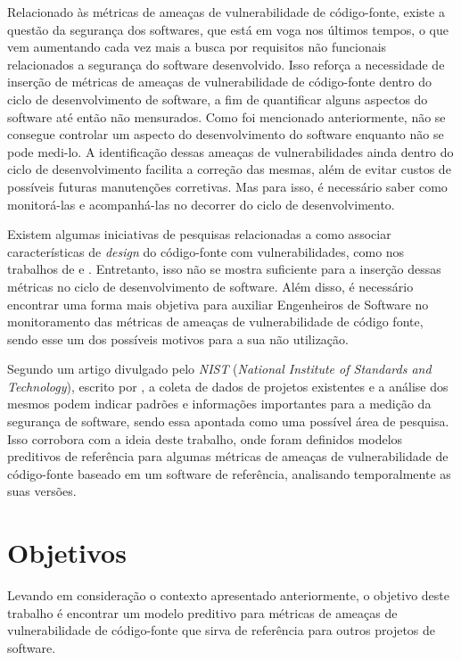 Relacionado às métricas de ameaças de vulnerabilidade de código-fonte, existe a
questão da segurança dos softwares, que está em voga nos últimos tempos,
o que vem aumentando cada vez mais a busca por requisitos não funcionais relacionados a
segurança do software desenvolvido. Isso reforça a necessidade de inserção de
métricas de ameaças de vulnerabilidade de código-fonte dentro do ciclo de
desenvolvimento de software, a fim de quantificar alguns aspectos do software
até então não mensurados. Como foi mencionado anteriormente, não se consegue
controlar um aspecto do desenvolvimento do software enquanto não se pode
medi-lo. A identificação dessas ameaças de vulnerabilidades ainda dentro do ciclo de
desenvolvimento facilita a correção das mesmas, além de evitar custos de
possíveis futuras manutenções corretivas. Mas para isso, é necessário saber como
monitorá-las e acompanhá-las no decorrer do ciclo de desenvolvimento.

Existem algumas iniciativas de pesquisas relacionadas a como associar
características de \textit{design} do código-fonte com vulnerabilidades, como
nos trabalhos de  e
. Entretanto, isso não se mostra suficiente para a
inserção dessas métricas no ciclo de desenvolvimento de software. Além disso, é
necessário encontrar uma forma mais objetiva para auxiliar Engenheiros de
Software no monitoramento das métricas de ameaças de vulnerabilidade de código
fonte, sendo esse um dos possíveis motivos para a sua não utilização.

Segundo um artigo divulgado pelo \textit{NIST} (\textit{National Institute of
Standards and Technology}), escrito por , a coleta
de dados de projetos existentes e a análise dos mesmos podem indicar padrões e
informações importantes para a medição da segurança de software, sendo essa
apontada como uma possível área de pesquisa. Isso corrobora com a ideia deste
trabalho, onde foram definidos modelos preditivos de referência para algumas
métricas de ameaças de vulnerabilidade de código-fonte baseado em um software de
referência, analisando temporalmente as suas versões.


\section{Objetivos} \label{sec:objetivos}

Levando em consideração o contexto apresentado anteriormente, o objetivo deste
trabalho é encontrar um modelo preditivo para métricas de ameaças de
vulnerabilidade de código-fonte que sirva de referência para outros projetos de
software.

